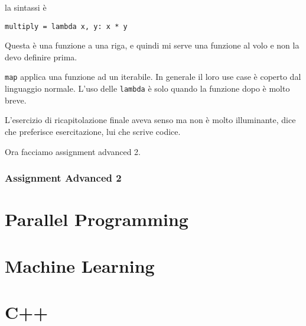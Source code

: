 \documentclass[10pt, a4paper, titlepage]{book}
\begin{document}
la sintassi è 
\begin{verbatim}
multiply = lambda x, y: x * y
\end{verbatim}

Questa è una funzione a una riga, e quindi mi serve una funzione al volo e non la devo definire prima.

\texttt{map} applica una funzione ad un iterabile.
In generale il loro use case è coperto dal linguaggio normale.
L'uso delle \texttt{lambda} è solo quando la funzione dopo è molto breve.

L'esercizio di ricapitolazione finale aveva senso ma non è molto illuminante, dice che preferisce esercitazione, lui che scrive codice.

Ora facciamo assignment advanced 2.

\subsection{Assignment Advanced 2}


\chapter{Parallel Programming}



\chapter{Machine Learning}



\chapter{C++}
\end{document}
